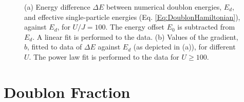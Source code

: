 \begin{figure}[t!]
    \centering
    \hfill
    \caption{(a) Energy difference $\Delta E$ between numerical doublon energies, $E_d$, and effective single-particle energies (Eq. \ref{Eq:DoublonHamiltonian}), against $E_d$, for $U/J=100$. The energy offset $E_0$ is subtracted from $E_d$. A linear fit is performed to the data. (b) Values of the gradient, $b$, fitted to data of $\Delta E$ against $E_d$ (as depicted in (a)), for different $U$. The power law fit is performed to the data for $U\geq100$.}
    \label{Fig:Doublon_Higher_Order}
\end{figure}
\text{}

\section{Doublon Fraction}\label{App:Doublon_Fraction}


